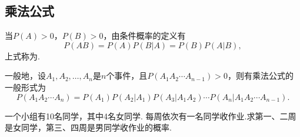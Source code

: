\subsection{乘法公式}
\begin{theorem}[概率的乘法]
当\(P(A) > 0\)，\(P(B) > 0\)，由条件概率的定义有\begin{equation}
P(AB) = P(A) P(B \vert A) = P(B) P(A \vert B),
\end{equation}上式称为.

一般地，设\(A_1,A_2,\dotsc,A_n\)是\(n\)个事件，且\(P(A_1 A_2 \dotsm A_{n-1}) > 0\)，则有乘法公式的一般形式为\begin{equation}
P(A_1 A_2 \dotsm A_n)
= P(A_1) P(A_2 \vert A_1) P(A_3 \vert A_1 A_2) \dotsm P(A_n \vert A_1 A_2 \dotsm A_{n-1}).
\end{equation}
\end{theorem}

\begin{example}
一个小组有10名同学，其中4名女同学.
每周依次有一名同学收作业.求第一、二周是女同学，第三、四周是男同学收作业的概率.
\end{example}

